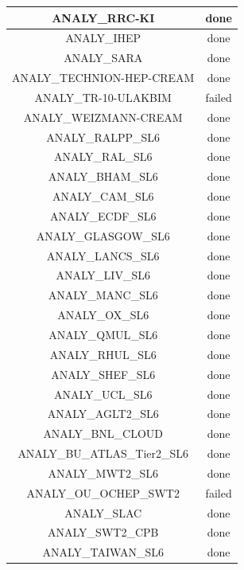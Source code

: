 \begin{longtable}{|c|c|}
	\hline
	\color{black}ANALY\_RRC-KI & \color{green}done \\
	\hline
	\color{black}ANALY\_IHEP & \color{green}done \\
	\hline
	\color{black}ANALY\_SARA & \color{green}done \\
	\hline
	\color{black}ANALY\_TECHNION-HEP-CREAM & \color{green}done \\
	\hline
	\color{black}ANALY\_TR-10-ULAKBIM & \color{red}failed \\
	\hline
	\color{black}ANALY\_WEIZMANN-CREAM & \color{green}done \\
	\hline
	\color{black}ANALY\_RALPP\_SL6 & \color{green}done \\
	\hline
	\color{black}ANALY\_RAL\_SL6 & \color{green}done \\
	\hline
	\color{black}ANALY\_BHAM\_SL6 & \color{green}done \\
	\hline
	\color{black}ANALY\_CAM\_SL6 & \color{green}done \\
	\hline
	\color{black}ANALY\_ECDF\_SL6 & \color{green}done \\
	\hline
	\color{black}ANALY\_GLASGOW\_SL6 & \color{green}done \\
	\hline
	\color{black}ANALY\_LANCS\_SL6 & \color{green}done \\
	\hline
	\color{black}ANALY\_LIV\_SL6 & \color{green}done \\
	\hline
	\color{black}ANALY\_MANC\_SL6 & \color{green}done \\
	\hline
	\color{black}ANALY\_OX\_SL6 & \color{green}done \\
	\hline
	\color{black}ANALY\_QMUL\_SL6 & \color{green}done \\
	\hline
	\color{black}ANALY\_RHUL\_SL6 & \color{green}done \\
	\hline
	\color{black}ANALY\_SHEF\_SL6 & \color{green}done \\
	\hline
	\color{black}ANALY\_UCL\_SL6 & \color{green}done \\
	\hline
	\color{black}ANALY\_AGLT2\_SL6 & \color{green}done \\
	\hline
	\color{black}ANALY\_BNL\_CLOUD & \color{green}done \\
	\hline
	\color{black}ANALY\_BU\_ATLAS\_Tier2\_SL6 & \color{green}done \\
	\hline
	\color{black}ANALY\_MWT2\_SL6 & \color{green}done \\
	\hline
	\color{black}ANALY\_OU\_OCHEP\_SWT2 & \color{red}failed \\
	\hline
	\color{black}ANALY\_SLAC & \color{green}done \\
	\hline
	\color{black}ANALY\_SWT2\_CPB & \color{green}done \\
	\hline
	\color{black}ANALY\_TAIWAN\_SL6 & \color{green}done \\
\hline

\end{longtable}
